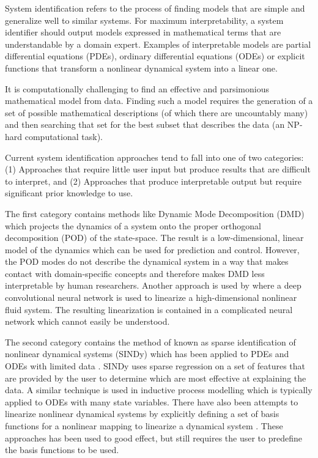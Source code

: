 \documentclass{article}
\begin{document}
System identification refers to the process of finding models that are simple and generalize well to similar systems. For maximum interpretability, a system identifier should output models expressed in mathematical terms that are understandable by a domain expert. Examples of interpretable models are partial differential equations (PDEs), ordinary differential equations (ODEs) or explicit functions that transform a nonlinear dynamical system into a linear one. 

It is computationally challenging to find an effective and parsimonious mathematical model from data. Finding such a model requires the generation of a set of possible mathematical descriptions (of which there are uncountably many) and then searching that set for the best subset that describes the data (an NP-hard computational task).
 
Current system identification approaches tend to fall into one of two categories: (1) Approaches that require little user input but produce results that are difficult to interpret, and (2) Approaches that produce interpretable output but require significant prior knowledge to use.

The first category contains methods like Dynamic Mode Decomposition (DMD) \cite{schmid2010dynamic, kutz2016dynamic} which projects the dynamics of a system onto the proper orthogonal decomposition (POD) of the state-space. The result is a low-dimensional, linear model of the dynamics which can be used for prediction and control. However, the POD modes do not describe the dynamical system in a way that makes contact with domain-specific concepts and therefore makes DMD less interpretable by human researchers. Another approach is used by \citet{morton2018deep} where a deep convolutional neural network is used to linearize a high-dimensional nonlinear fluid system. The resulting linearization is contained in a complicated neural network which cannot easily be understood.

The second category contains the method of \citet{brunton2016discovering} known as sparse identification of nonlinear dynamical systems (SINDy) which has been applied to PDEs \cite{rudy2017data} and ODEs with limited data \cite{kaiser2018sparse}. SINDy uses sparse regression on a set of features that are provided by the user to determine which are most effective at explaining the data. A similar technique is used in inductive process modelling \cite{bridewell2008inductive, langley2015heuristic} which is typically applied to ODEs with many state variables. There have also been attempts to linearize nonlinear dynamical systems by explicitly defining a set of basis functions for a nonlinear mapping to linearize a dynamical system \cite{williams2015data, johnson2018class}. These approaches has been used to good effect, but still requires the user to predefine the basis functions to be used. 
\end{document}
